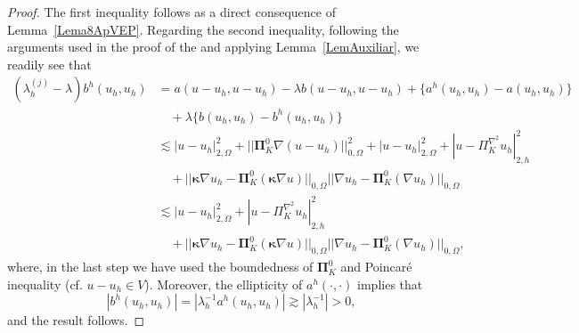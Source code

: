 \documentclass[final,reqno]{elsarticle}
\def\bkappa{\boldsymbol{\kappa}}
\def\bPi{\mathbf{\Pi}}
\begin{document}
\begin{proof}
The first inequality follows as a direct consequence of Lemma~\ref{Lema8ApVEP}. Regarding the second inequality, following the arguments used in the proof of the  \cite[Theorem~4.4]{MoraVelasquez2020} and applying Lemma~\ref{LemAuxiliar}, we readily see that 
\begin{align*}
    (\lambda_h^{(j)}-\lambda)b^h(u_h,u_h)&= a(u-u_h,u-u_h) - \lambda b(u-u_h,u-u_h) + \big\{  a^h(u_h,u_h)-a(u_h,u_h) \big\} \nonumber\\
    & \quad + \lambda \big\{ b(u_h,u_h)-b^h(u_h,u_h)\big\} \nonumber\\
    &\lesssim |u-u_h|^2_{2,\Omega} + ||\bPi_K^0\nabla(u-u_h)||_{0,\Omega}^2 + |u-u_h|_{2,\Omega}^2 + |u-\Pi_K^{\nabla^2}u_h|_{2,h}^2\nonumber\\ 
    &\quad +||\bkappa \nabla u_h - \bPi_K^0(\bkappa \nabla u)   ||_{0,\Omega} ||\nabla u_h -\bPi_K^0(\nabla u_h)  ||_{0,\Omega}\nonumber\\
    &\lesssim |u-u_h|^2_{2,\Omega}  + |u-\Pi_K^{\nabla^2}u_h|_{2,h}^2\\
    &\quad +||\bkappa \nabla u_h - \bPi_K^0(\bkappa \nabla u)   ||_{0,\Omega} ||\nabla u_h -\bPi_K^0(\nabla u_h)  ||_{0,\Omega}\nonumber,
\end{align*}
where, in the last step we have used the boundedness of $\bPi_K^0$ and  Poincar\'e inequality (cf. $u-u_h\in V$). Moreover, the ellipticity of $ a^h(\cdot,\cdot)$ implies that
\begin{equation*}
    |b^h(u_h,u_h)|=|\lambda_h^{-1} a^h(u_h,u_h)|\gtrsim |\lambda_h^{-1}| > 0,
\end{equation*}
and the result follows.
\end{proof}
\end{document}
